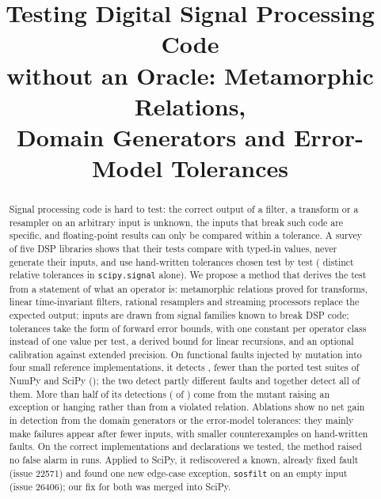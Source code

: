 \documentclass[10pt,conference]{IEEEtran}
\newcommand{\code}[1]{\texttt{#1}}
\begin{document}
\title{Testing Digital Signal Processing Code\\without an Oracle: Metamorphic Relations,\\Domain Generators and Error-Model Tolerances}

\author{
}

\maketitle

\begin{abstract}
Signal processing code is hard to test: the correct output of a filter, a
transform or a resampler on an arbitrary input is unknown, the inputs that break
such code are specific, and floating-point results can only be compared within
a tolerance. A survey of five DSP libraries shows that their tests compare with
typed-in values, never generate their inputs, and use hand-written tolerances
chosen test by test (\surveyScipyRelDistinct{} distinct relative tolerances in
\code{scipy.signal} alone). We propose a method
that derives the test from a statement of what an operator is: metamorphic
relations proved for transforms, linear time-invariant filters, rational
resamplers and streaming processors replace the expected output; inputs are
drawn from signal families known to break DSP code; tolerances take the form
of forward error bounds, with one constant per operator class instead of one
value per test, a derived bound for linear recursions, and an optional
calibration against extended precision. On \nFunctional{} functional faults
injected by mutation into four small reference implementations, it detects
\killFuncDsp{}, fewer than the ported test suites of NumPy and SciPy
(\killFuncSop{}); the two detect partly different faults and together detect
all of them. More than half of its detections (\dspKillOther{} of
\dspKillsSeedZero) come from the mutant raising an exception or hanging rather
than from a violated relation. Ablations show no
net gain in detection from the domain generators or the error-model
tolerances: they mainly make failures appear after fewer inputs, with smaller
counterexamples on hand-written faults. On the correct implementations and
declarations we tested, the method raised no false alarm in \fpRuns{} runs.
Applied to SciPy, it rediscovered a known, already fixed fault (issue 22571)
and found one new edge-case exception, \code{sosfilt} on an empty input (issue
26406); our fix for both was merged into SciPy.
\end{abstract}
\end{document}

